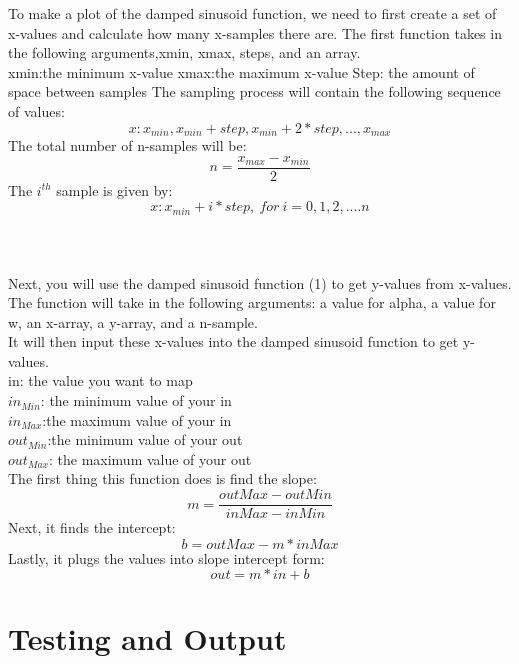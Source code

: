 \documentclass[letterpaper, 24pt, final, onecolumn, titlepage] {article}
\begin{document}
To make a plot of the damped sinusoid function, we need to ﬁrst create a set of x-values and calculate how many x-samples there are. The ﬁrst function takes in the following arguments,xmin, xmax, steps, and an array.\\
xmin:the minimum x-value
xmax:the maximum x-value
Step: the amount of space between samples
The sampling process will contain the following sequence of values:
\begin{equation}x : x_{min}, x_{min} + step,  x_{min} + 2*{step}, ... , x_{max}\end{equation}
The total number of n-samples will be:
\begin{equation}n=\frac{x_{max}-x_{min}}{2}\end{equation}
The $i^{th}$ sample is given by:
\begin{equation}x : x_{min} + i*step, \ for\ i = 0, 1, 2, ....n\end{equation}
\\\\\\
Next, you will use the damped sinusoid function (1) to get y-values from x-values. The function will take in the following arguments: a value for alpha, a value for w, an x-array, a y-array, and a n-sample.\\
It will then input these x-values into the damped sinusoid function to get y-values.\\
in: the value you want to map\\
$in_{Min}$: the minimum value of your in\\
$in_{Max}$:the maximum value of your in\\
$out_{Min}$:the minimum value of your out\\
$out_{Max}$: the maximum value of your out\\
The ﬁrst thing this function does is ﬁnd the slope:
\begin{equation}m=\frac{outMax-outMin}{inMax-inMin}\end{equation}
Next, it finds the intercept:
\begin{equation} b= outMax - m*inMax\end{equation}
Lastly, it plugs the values into slope intercept form:
\begin{equation} out = m *in + b\end{equation}

\section{Testing and Output}
\end{document}

